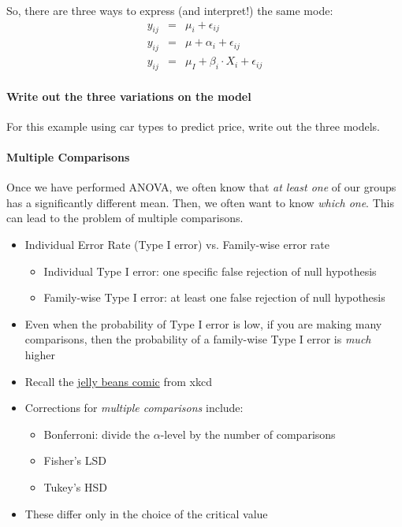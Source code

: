 \documentclass[10pt]{article}\usepackage[]{graphicx}\usepackage[]{color}
\begin{document}
So, there are three ways to express (and interpret!) the same mode: 
\begin{eqnarray*}
     y_{ij} &=& \mu_i + \epsilon_{ij}  \\
     y_{ij} &=& \mu + \alpha_i + \epsilon_{ij} \\
     y_{ij} &=& \mu_I + \beta_i \cdot X_i + \epsilon_{ij}
\end{eqnarray*}
\paragraph{Write out the three variations on the model} For this example using car types to predict price, write out the three models.
\vspace{3in}



\paragraph{Multiple Comparisons}
Once we have performed ANOVA, we often know that \emph{at least one} of our groups has a significantly different mean. Then, we often want to know \emph{which one}. This can lead to the problem of multiple comparisons. 
	\begin{itemize}
		\item Individual Error Rate (Type I error) vs. Family-wise error rate
		\begin{itemize}
			\item Individual Type I error: one specific false rejection of null hypothesis
			\item Family-wise Type I error: at least one false rejection of null hypothesis
		\end{itemize}
		\item Even when the probability of Type I error is low, if you are making many comparisons, then the probability of a family-wise Type I error is \emph{much} higher
		\item Recall the \href{https://xkcd.com/882/}{jelly beans comic} from xkcd
		\item Corrections for \emph{multiple comparisons} include:
		\begin{itemize}
			\item Bonferroni: divide the $\alpha$-level by the number of comparisons
			\item Fisher's LSD
			\item Tukey's HSD
		\end{itemize}
		\item These differ only in the choice of the critical value
	\end{itemize}
\end{document}
